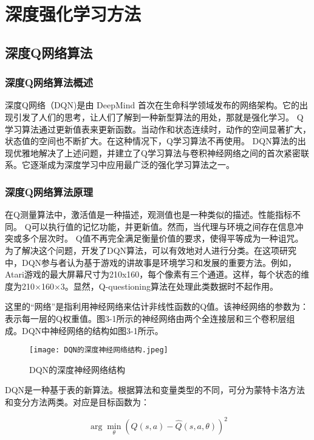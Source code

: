 \chapter{深度强化学习方法}

\section{深度Q网络算法 }

\subsection{深度Q网络算法概述 }

深度Q网络（DQN)\cite{mnih2015human}是由 DeepMind 首次在生命科学领域发布的网络架构。它的出现引发了人们的思考，让人们了解到一种新型算法的用处，那就是强化学习。 Q学习算法通过更新值表来更新函数。当动作和状态连续时，动作的空间显著扩大，状态值的空间也不断扩大。在这种情况下，Q学习算法不再使用。 DQN算法的出现优雅地解决了上述问题，并建立了Q学习算法与卷积神经网络之间的首次紧密联系。它逐渐成为深度学习中应用最广泛的强化学习算法之一。

\subsection{深度Q网络算法原理 }

在Q测量算法中，激活值是一种描述，观测值也是一种类似的描述。性能指标不同。 Q可以执行值的记忆功能，并更新值。然而，当代理与环境之间存在信息冲突或多个层次时。 Q值不再完全满足衡量价值的要求，使得平等成为一种诅咒。为了解决这个问题，开发了DQN算法，可以有效地对人进行分类。在这项研究中，DQN参与者认为基于游戏的讲故事是环境学习和发展的重要方法。例如，Atari游戏的最大屏幕尺寸为210x160，每个像素有三个通道。这样，每个状态的维度为210×160×3。显然，Q-questioning算法在处理此类数据时不起作用。

这里的“网络”是指利用神经网络来估计非线性函数的Q值。该神经网络的参数为： 表示每一层的Q权重值。图3-1所示的神经网络由两个全连接层和三个卷积层组成。DQN中神经网络的结构如图3-1所示。

\begin{figure}[hbt]
	\centering
	\texttt{[image: DQN的深度神经网络结构.jpeg]}
	\caption{DQN的深度神经网络结构}
	\label{f.example}
\end{figure}

DQN是一种基于表的新算法。根据算法和变量类型的不同，可分为蒙特卡洛方法和变分方法两类。对应是目标函数为：

\begin{equation}
	\arg\min_{\theta} \left( Q(s,a) - \hat{Q}(s,a,\theta) \right)^2
\end{equation}

